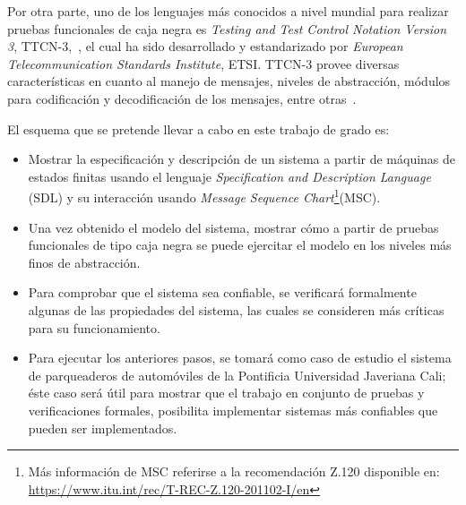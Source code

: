 Por otra parte, uno de los lenguajes m\'as conocidos a nivel mundial para 
realizar pruebas funcionales de caja negra es \textit{Testing and Test Control 
Notation Version 3}, TTCN-3,~\cite{Willcock2011,  ETSI}, el cual ha 
sido desarrollado y estandarizado por \textit{European Telecommunication 
Standards Institute}, ETSI. TTCN-3 provee diversas caracter\'isticas en cuanto 
al manejo de mensajes, niveles de abstracci\'on, m\'odulos para codificaci\'on 
y decodificaci\'on de los mensajes, entre otras~\cite{Willcock2011,ETSI}.

El esquema que se pretende llevar a cabo en este trabajo de grado es: 

\begin{itemize}
\item Mostrar la especificaci\'on y descripci\'on de un sistema a partir de 
m\'aquinas de estados finitas usando el lenguaje \textit{Specification and 
Description Language} (SDL) y su interacci\'on usando \textit{Message Sequence 
Chart}\footnote{M\'as informaci\'on de MSC referirse a la recomendaci\'on Z.120 
disponible en:  \url{https://www.itu.int/rec/T-REC-Z.120-201102-I/en}}(MSC).
\item Una vez obtenido el modelo del sistema, mostrar c\'omo a partir de 
pruebas funcionales de tipo caja negra se puede ejercitar el modelo en los 
niveles m\'as finos  de abstracci\'on. 
\item Para comprobar que el sistema sea confiable, se verificar\'a formalmente 
algunas de las propiedades del sistema, las cuales se consideren m\'as 
cr\'iticas para su funcionamiento.
\item Para ejecutar los anteriores pasos, se tomar\'a como caso de estudio el sistema de parqueaderos de autom\'oviles de la Pontificia Universidad Javeriana 
Cali; \'este caso ser\'a \'util para mostrar que el trabajo en conjunto de 
pruebas y verificaciones formales, posibilita implementar sistemas m\'as confiables que pueden 
ser implementados.

\end{itemize}

